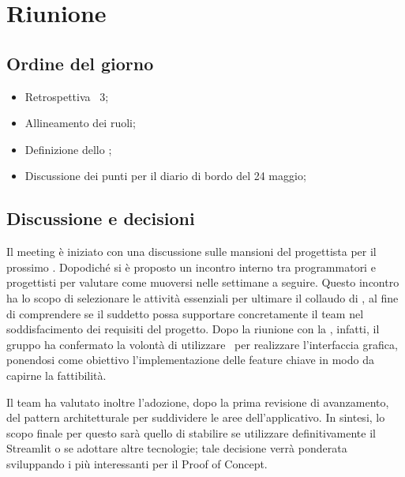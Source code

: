 \section{Riunione}
\subsection{Ordine del giorno}
\begin{itemize}
	\item Retrospettiva \ 3;
	\item Allineamento dei ruoli;
	\item Definizione dello ;
	\item Discussione dei punti per il diario di bordo del 24 maggio;
\end{itemize}

\subsection{Discussione e decisioni}
\par Il meeting è iniziato con una discussione sulle mansioni del progettista per il prossimo . 
Dopodiché si è proposto un incontro interno tra programmatori e progettisti per valutare come muoversi nelle settimane a seguire. 
Questo incontro ha lo scopo di selezionare le attività essenziali per ultimare il collaudo di , al fine di comprendere se il suddetto  possa supportare concretamente il team nel soddisfacimento dei requisiti del progetto.
Dopo la riunione con la , infatti, il gruppo ha confermato la volontà di utilizzare \ per realizzare l'interfaccia grafica, ponendosi come obiettivo l'implementazione delle feature chiave in modo da capirne la fattibilità.
\par Il team ha valutato inoltre l'adozione, dopo la prima revisione di avanzamento, del pattern architetturale  per suddividere le aree dell'applicativo. 
In sintesi, lo scopo finale per questo  sarà quello di stabilire se utilizzare definitivamente il  Streamlit o se adottare altre tecnologie; tale decisione verrà ponderata sviluppando i  più interessanti per il Proof of Concept.
